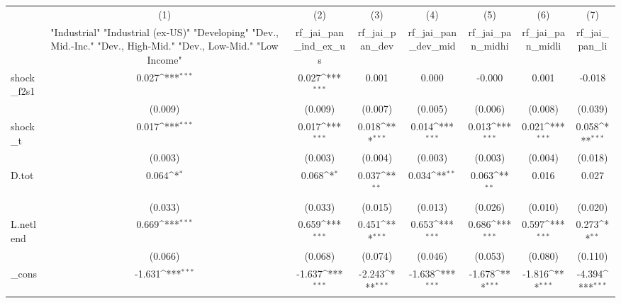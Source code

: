 {
\def\sym#1{\ifmmode^{#1}\else\(^{#1}\)\fi}
\begin{tabular}{l*{7}{c}}
\toprule
            &\multicolumn{1}{c}{(1)}&\multicolumn{1}{c}{(2)}&\multicolumn{1}{c}{(3)}&\multicolumn{1}{c}{(4)}&\multicolumn{1}{c}{(5)}&\multicolumn{1}{c}{(6)}&\multicolumn{1}{c}{(7)}\\
            &\multicolumn{1}{c}{ "Industrial" "Industrial (ex-US)" "Developing" "Dev., Mid.-Inc." "Dev., High-Mid."  "Dev., Low-Mid." "Low Income" }&\multicolumn{1}{c}{rf\_jai\_pan\_ind\_ex\_us}&\multicolumn{1}{c}{rf\_jai\_pan\_dev}&\multicolumn{1}{c}{rf\_jai\_pan\_dev\_mid}&\multicolumn{1}{c}{rf\_jai\_pan\_midhi}&\multicolumn{1}{c}{rf\_jai\_pan\_midli}&\multicolumn{1}{c}{rf\_jai\_pan\_li}\\
\midrule
shock\_f2s1  &       0.027\sym{***}&       0.027\sym{***}&       0.001         &       0.000         &      -0.000         &       0.001         &      -0.018         \\
            &     (0.009)         &     (0.009)         &     (0.007)         &     (0.005)         &     (0.006)         &     (0.008)         &     (0.039)         \\
\addlinespace
shock\_t     &       0.017\sym{***}&       0.017\sym{***}&       0.018\sym{***}&       0.014\sym{***}&       0.013\sym{***}&       0.021\sym{***}&       0.058\sym{***}\\
            &     (0.003)         &     (0.003)         &     (0.004)         &     (0.003)         &     (0.003)         &     (0.004)         &     (0.018)         \\
\addlinespace
D.tot       &       0.064\sym{*}  &       0.068\sym{*}  &       0.037\sym{**} &       0.034\sym{**} &       0.063\sym{**} &       0.016         &       0.027         \\
            &     (0.033)         &     (0.033)         &     (0.015)         &     (0.013)         &     (0.026)         &     (0.010)         &     (0.020)         \\
\addlinespace
L.netlend   &       0.669\sym{***}&       0.659\sym{***}&       0.451\sym{***}&       0.653\sym{***}&       0.686\sym{***}&       0.597\sym{***}&       0.273\sym{**} \\
            &     (0.066)         &     (0.068)         &     (0.074)         &     (0.046)         &     (0.053)         &     (0.080)         &     (0.110)         \\
\addlinespace
\_cons      &      -1.631\sym{***}&      -1.637\sym{***}&      -2.243\sym{***}&      -1.638\sym{***}&      -1.678\sym{***}&      -1.816\sym{***}&      -4.394\sym{***}\\

\end{tabular}}
